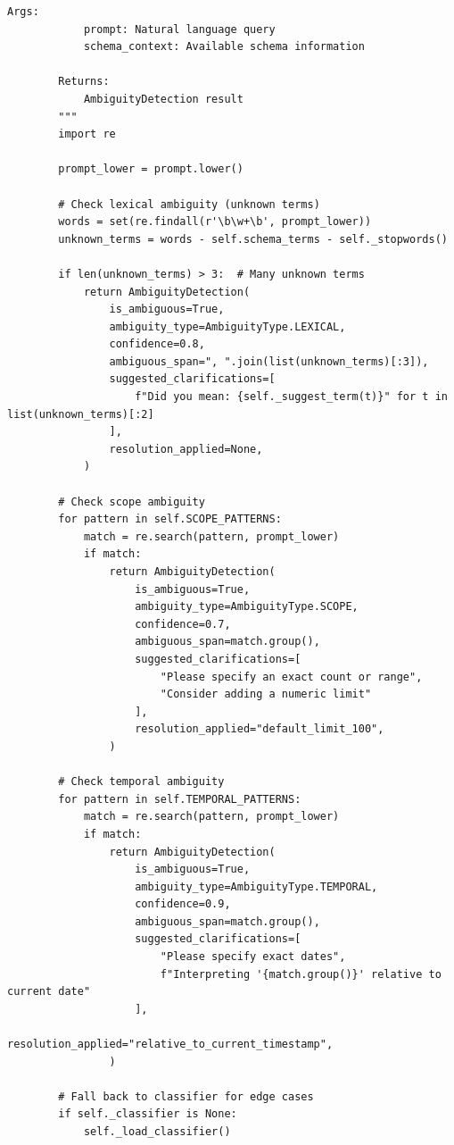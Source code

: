 \begin{lstlisting}[language=jsonx,caption={ARR module architecture}]
        Args:
            prompt: Natural language query
            schema_context: Available schema information
            
        Returns:
            AmbiguityDetection result
        """
        import re
        
        prompt_lower = prompt.lower()
        
        # Check lexical ambiguity (unknown terms)
        words = set(re.findall(r'\b\w+\b', prompt_lower))
        unknown_terms = words - self.schema_terms - self._stopwords()
        
        if len(unknown_terms) > 3:  # Many unknown terms
            return AmbiguityDetection(
                is_ambiguous=True,
                ambiguity_type=AmbiguityType.LEXICAL,
                confidence=0.8,
                ambiguous_span=", ".join(list(unknown_terms)[:3]),
                suggested_clarifications=[
                    f"Did you mean: {self._suggest_term(t)}" for t in list(unknown_terms)[:2]
                ],
                resolution_applied=None,
            )
        
        # Check scope ambiguity
        for pattern in self.SCOPE_PATTERNS:
            match = re.search(pattern, prompt_lower)
            if match:
                return AmbiguityDetection(
                    is_ambiguous=True,
                    ambiguity_type=AmbiguityType.SCOPE,
                    confidence=0.7,
                    ambiguous_span=match.group(),
                    suggested_clarifications=[
                        "Please specify an exact count or range",
                        "Consider adding a numeric limit"
                    ],
                    resolution_applied="default_limit_100",
                )
        
        # Check temporal ambiguity
        for pattern in self.TEMPORAL_PATTERNS:
            match = re.search(pattern, prompt_lower)
            if match:
                return AmbiguityDetection(
                    is_ambiguous=True,
                    ambiguity_type=AmbiguityType.TEMPORAL,
                    confidence=0.9,
                    ambiguous_span=match.group(),
                    suggested_clarifications=[
                        "Please specify exact dates",
                        f"Interpreting '{match.group()}' relative to current date"
                    ],
                    resolution_applied="relative_to_current_timestamp",
                )
        
        # Fall back to classifier for edge cases
        if self._classifier is None:
            self._load_classifier()
        

\end{lstlisting}
